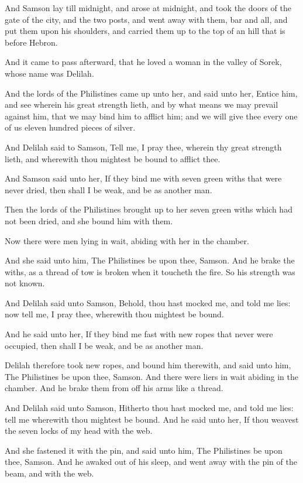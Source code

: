 \Verse And Samson lay till midnight, and arose at midnight, and took the doors of the gate of the city, and the two posts, and went away with them, bar and all, and put them upon his shoulders, and carried them up to the top of an hill that is before Hebron.

\Verse And it came to pass afterward, that he loved a woman in the valley of Sorek, whose name was Delilah.

\Verse And the lords of the Philistines came up unto her, and said unto her, Entice him, and see wherein his great strength lieth, and by what means we may prevail against him, that we may bind him to afflict him; and we will give thee every one of us eleven hundred pieces of silver.

\Verse And Delilah said to Samson, Tell me, I pray thee, wherein thy great strength lieth, and wherewith thou mightest be bound to afflict thee.

\Verse And Samson said unto her, If they bind me with seven green withs that were never dried, then shall I be weak, and be as another man.

\Verse Then the lords of the Philistines brought up to her seven green withs which had not been dried, and she bound him with them.

\Verse Now there were men lying in wait, abiding with her in the chamber.

And she said unto him, The Philistines be upon thee, Samson. And he brake the withs, as a thread of tow is broken when it toucheth the fire. So his strength was not known.

\Verse And Delilah said unto Samson, Behold, thou hast mocked me, and told me lies: now tell me, I pray thee, wherewith thou mightest be bound.

\Verse And he said unto her, If they bind me fast with new ropes that never were occupied, then shall I be weak, and be as another man.

\Verse Delilah therefore took new ropes, and bound him therewith, and said unto him, The Philistines be upon thee, Samson. And there were liers in wait abiding in the chamber. And he brake them from off his arms like a thread.

\Verse And Delilah said unto Samson, Hitherto thou hast mocked me, and told me lies: tell me wherewith thou mightest be bound. And he said unto her, If thou weavest the seven locks of my head with the web.

\Verse And she fastened it with the pin, and said unto him, The Philistines be upon thee, Samson. And he awaked out of his sleep, and went away with the pin of the beam, and with the web.

